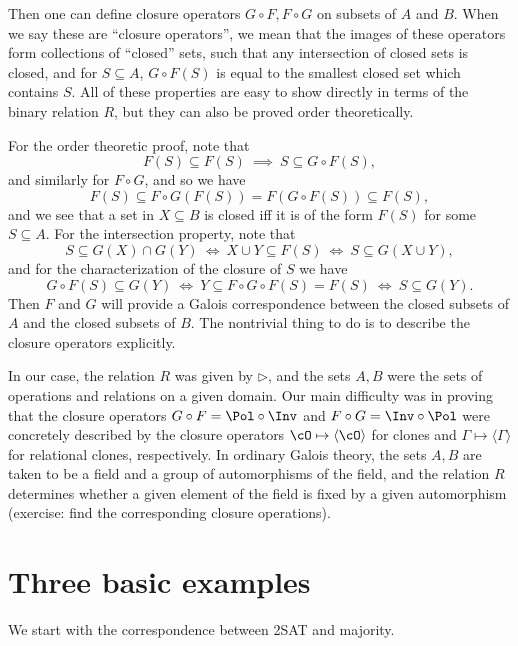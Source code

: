 \begin{rem}
Then one can define closure operators $G\circ F, F\circ G$ on subsets of $A$ and $B$. When we say these are ``closure operators'', we mean that the images of these operators form collections of ``closed'' sets, such that any intersection of closed sets is closed, and for $S \subseteq A$, $G\circ F(S)$ is equal to the smallest closed set which contains $S$. All of these properties are easy to show directly in terms of the binary relation $R$, but they can also be proved order theoretically.

For the order theoretic proof, note that
\[
F(S) \subseteq F(S)\ \implies\ S \subseteq G\circ F(S),
\]
and similarly for $F\circ G$, and so we have
\[
F(S) \subseteq F\circ G(F(S)) = F(G\circ F(S)) \subseteq F(S),
\]
and we see that a set in $X \subseteq B$ is closed iff it is of the form $F(S)$ for some $S \subseteq A$. For the intersection property, note that
\[
S \subseteq G(X) \cap G(Y)\ \iff\ X \cup Y \subseteq F(S)\ \iff\ S \subseteq G(X\cup Y),
\]
and for the characterization of the closure of $S$ we have
\[
G\circ F(S) \subseteq G(Y)\ \iff\ Y \subseteq F\circ G\circ F(S) = F(S)\ \iff\ S \subseteq G(Y).
\]
Then $F$ and $G$ will provide a Galois correspondence between the closed subsets of $A$ and the closed subsets of $B$. The nontrivial thing to do is to describe the closure operators explicitly.

In our case, the relation $R$ was given by $\rhd$, and the sets $A,B$ were the sets of operations and relations on a given domain. Our main difficulty was in proving that the closure operators $G\circ F = \Pol \circ \Inv$ and $F \circ G = \Inv \circ \Pol$ were concretely described by the closure operators $\cO \mapsto \langle \cO \rangle$ for clones and $\Gamma \mapsto \langle \Gamma \rangle$ for relational clones, respectively. In ordinary Galois theory, the sets $A,B$ are taken to be a field and a group of automorphisms of the field, and the relation $R$ determines whether a given element of the field is fixed by a given automorphism (exercise: find the corresponding closure operations).
\end{rem}


\section{Three basic examples}

We start with the correspondence between 2SAT and majority.

